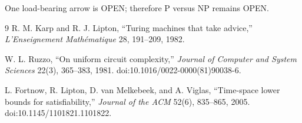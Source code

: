 \documentclass[11pt]{article}
\begin{document}
One load-bearing arrow is OPEN; therefore P versus NP remains OPEN.

\begin{thebibliography}{9}
R. M. Karp and R. J. Lipton, ``Turing machines that take advice,''
\emph{L'Enseignement Math\'ematique} 28, 191--209, 1982.

W. L. Ruzzo, ``On uniform circuit complexity,'' \emph{Journal of Computer
and System Sciences} 22(3), 365--383, 1981.
doi:10.1016/0022-0000(81)90038-6.

L. Fortnow, R. Lipton, D. van Melkebeek, and A. Viglas,
``Time-space lower bounds for satisfiability,'' \emph{Journal of the ACM}
52(6), 835--865, 2005. doi:10.1145/1101821.1101822.
\end{thebibliography}

\end{document}
